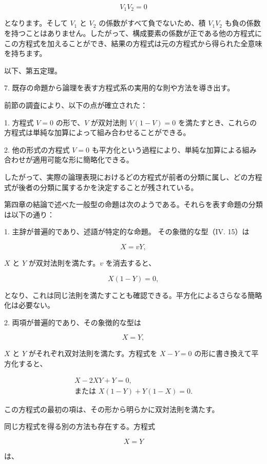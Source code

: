 \documentclass[a4paper,11pt,openany]{ltjsbook}
\begin{document}
\[
V_{1}V_{2} = 0
\]

となります。そして $V_{1}$ と $V_{2}$ の係数がすべて負でないため、積 $V_{1}V_{2}$ も負の係数を持つことはありません。したがって、構成要素の係数が正である他の方程式にこの方程式を加えることができ、結果の方程式は元の方程式から得られた全意味を持ちます。

以下、第五定理。

7. 既存の命題から論理を表す方程式系の実用的な則や方法を導き出す。

前節の調査により、以下の点が確立された：

1. 方程式 $V = 0$ の形で、$V$ が双対法則 $V(1 - V) = 0$ を満たすとき、これらの方程式は単純な加算によって組み合わせることができる。

2. 他の形式の方程式 $V = 0$ も平方化という過程により、単純な加算による組み合わせが適用可能な形に簡略化できる。

したがって、実際の論理表現におけるどの方程式が前者の分類に属し、どの方程式が後者の分類に属するかを決定することが残されている。

第四章の結論で述べた一般型の命題は次のようである。それらを表す命題の分類は以下の通り：

1. 主辞が普遍的であり、述語が特定的な命題。
その象徴的な型（IV. 15）は

\[
X = vY,
\]

$X$ と $Y$ が双対法則を満たす。$v$ を消去すると、

\setcounter{equation}{0}
\begin{equation}
X(1 - Y) = 0,
\end{equation}

となり、これは同じ法則を満たすことも確認できる。平方化によるさらなる簡略化は必要ない。

2. 両項が普遍的であり、その象徴的な型は

\[
X = Y,
\]

$X$ と $Y$ がそれぞれ双対法則を満たす。方程式を $X - Y = 0$ の形に書き換えて平方化すると、

\begin{eqnarray}
X - 2XY + Y = 0,\nonumber\\
\textrm{または } X(1 - Y) + Y(1 - X) = 0.
\end{eqnarray}

この方程式の最初の項は、その形から明らかに双対法則を満たす。

同じ方程式を得る別の方法も存在する。方程式

\[
X = Y
\]

は、
\end{document}
